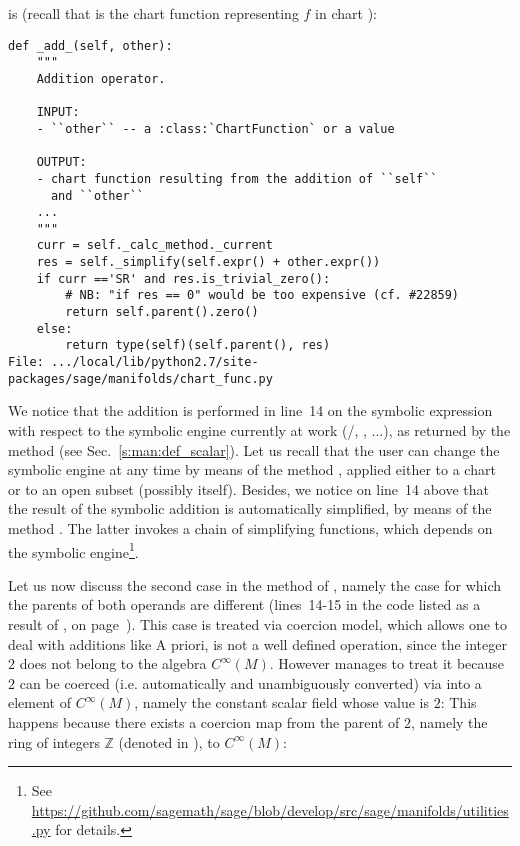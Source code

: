 is (recall that  is the chart function representing $f$ in chart ):
\begin{lstlisting}
def _add_(self, other):
    """
    Addition operator.

    INPUT:
    - ``other`` -- a :class:`ChartFunction` or a value

    OUTPUT:
    - chart function resulting from the addition of ``self``
      and ``other``
    ...
    """
    curr = self._calc_method._current
    res = self._simplify(self.expr() + other.expr())
    if curr =='SR' and res.is_trivial_zero():
        # NB: "if res == 0" would be too expensive (cf. #22859)
        return self.parent().zero()
    else:
        return type(self)(self.parent(), res)
File: .../local/lib/python2.7/site-packages/sage/manifolds/chart_func.py
\end{lstlisting}
We notice that the addition is performed in line~14 on the symbolic expression
with respect to the symbolic engine currently at work (\Sage{}/, , ...), as returned by
the method  (see Sec.~\ref{s:man:def_scalar}).
Let us recall that the user can change the symbolic engine at any time
by means of the method , applied either to
a chart or to an open subset (possibly  itself).
Besides, we notice on line~14 above that the result of the symbolic addition
is automatically simplified, by means of the method .
The latter invokes a chain of simplifying functions, which depends on the
symbolic engine\footnote{See
\url{https://github.com/sagemath/sage/blob/develop/src/sage/manifolds/utilities.py}
for details.}.

Let us now discuss the second case in the  method of
, namely the case for which the parents of both operands are
different (lines~14-15 in the code listed as a result of ,
on page~\pageref{p:man:list___add__}). This case is treated via \Sage{} coercion model, which allows one to deal with additions like
A priori,  is not a well defined operation, since the integer $2$ does not
belong to the algebra $C^\infty(M)$. However \Sage{} manages to treat it
because $2$ can be coerced (i.e. automatically and unambiguously converted) via 
into a element of $C^\infty(M)$, namely the constant scalar field whose value is $2$:
This happens because there exists a coercion map from the parent of $2$, namely the ring of integers $\mathbb{Z}$
(denoted  in \Sage{}), to $C^\infty(M)$:
